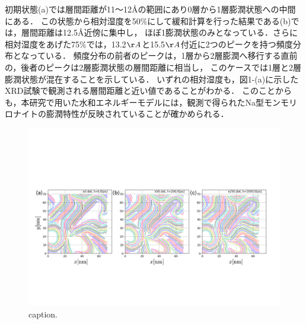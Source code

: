 初期状態(a)では層間距離が11〜12Åの範囲にあり0層から1層膨潤状態への中間にある．
この状態から相対湿度を50$\%$にして緩和計算を行った結果である(b)では，層間距離は12.5Å近傍に集中し，
ほぼ1膨潤状態のみとなっている．さらに相対湿度をあげた75$\%$では，13.2$\AA$と15.5$\AA$付近に2つのピークを持つ頻度分布となっている．
頻度分布の前者のピークは，1層から2層膨潤へ移行する直前の，後者のピークは2層膨潤状態の層間距離に相当し，
このケースでは1層と2層膨潤状態が混在することを示している．
いずれの相対湿度も，図1-(a)に示したXRD試験で観測される層間距離と近い値であることがわかる．
このことからも，本研究で用いた水和エネルギーモデルには，観測で得られたNa型モンモリロナイトの膨潤特性が反映されていることが確かめられる．
\begin{figure}[h]
	\begin{center}
	\includegraphics[width=1.0\linewidth]{Figs/fig3.pdf} 
	\end{center}
	\caption{
		caption.
	} 
	\label{fig:fig3}
\end{figure}
